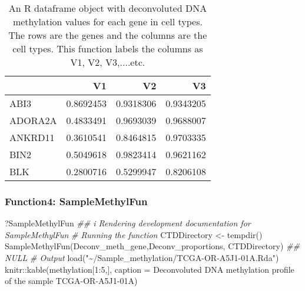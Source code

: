 \documentclass[]{article}
\newcommand{\hlnum}[1]{\textcolor[rgb]{0.816,0.125,0.439}{#1}}%
\newcommand{\hlstr}[1]{\textcolor[rgb]{0.251,0.627,0.251}{#1}}%
\newcommand{\hlcom}[1]{\textcolor[rgb]{0.502,0.502,0.502}{\textit{#1}}}%
\newcommand{\hlstd}[1]{\textcolor[rgb]{0.251,0.251,0.251}{#1}}%
\newenvironment{Shaded}{\begin{myshaded}}{\end{myshaded}}
\newcommand{\DecValTok}[1]{\hlnum{#1}}
\newcommand{\SpecialCharTok}[1]{\hlstr{#1}}
\newcommand{\StringTok}[1]{\hlstr{#1}}
\newcommand{\CommentTok}[1]{\hlcom{#1}}
\newcommand{\DocumentationTok}[1]{\hlcom{#1}}
\newcommand{\OtherTok}[1]{{#1}}
\newcommand{\FunctionTok}[1]{\hlstd{#1}}
\newcommand{\AttributeTok}[1]{{#1}}
\newcommand{\NormalTok}[1]{\hlstd{#1}}
\begin{document}
\begin{table}

\caption{\label{tab:unnamed-chunk-74}An R dataframe object with deconvoluted DNA methylation values for each gene in cell types. The rows are the genes and the columns are the cell types. This function labels the columns as V1, V2, V3,....etc.}
\centering
\begin{tabular}[t]{l|r|r|r}
\hline
  & V1 & V2 & V3\\
\hline
ABI3 & 0.8692453 & 0.9318306 & 0.9343205\\
\hline
ADORA2A & 0.4833491 & 0.9693039 & 0.9688007\\
\hline
ANKRD11 & 0.3610541 & 0.8464815 & 0.9703335\\
\hline
BIN2 & 0.5049618 & 0.9823414 & 0.9621162\\
\hline
BLK & 0.2800716 & 0.5299947 & 0.8206108\\
\hline
\end{tabular}
\end{table}

\hypertarget{function4-samplemethylfun}{%
\subsubsection{\texorpdfstring{ Function4: SampleMethylFun}{  Function4: SampleMethylFun}}\label{function4-samplemethylfun}}

\begin{Shaded}
\begin{Highlighting}[]
\NormalTok{?SampleMethylFun}
\DocumentationTok{\#\# i Rendering development documentation for \textquotesingle{}SampleMethylFun\textquotesingle{}}
\CommentTok{\# Running the function}
\NormalTok{CTDDirectory }\OtherTok{\textless{}{-}} \FunctionTok{tempdir}\NormalTok{()}
\FunctionTok{SampleMethylFun}\NormalTok{(Deconv\_meth\_gene,Deconv\_proportions, CTDDirectory)}
\DocumentationTok{\#\# NULL}
\CommentTok{\# Output}
\FunctionTok{load}\NormalTok{(}\StringTok{"\textasciitilde{}/Sample\_methylation/TCGA{-}OR{-}A5J1{-}01A.Rda"}\NormalTok{)}
\NormalTok{knitr}\SpecialCharTok{::}\FunctionTok{kable}\NormalTok{(methylation[}\DecValTok{1}\SpecialCharTok{:}\DecValTok{5}\NormalTok{,], }\AttributeTok{caption =} \StringTok{\textquotesingle{}Deconvoluted DNA methylation profile of the sample TCGA{-}OR{-}A5J1{-}01A\textquotesingle{}}\NormalTok{)}
\end{Highlighting}
\end{Shaded}
\end{document}
